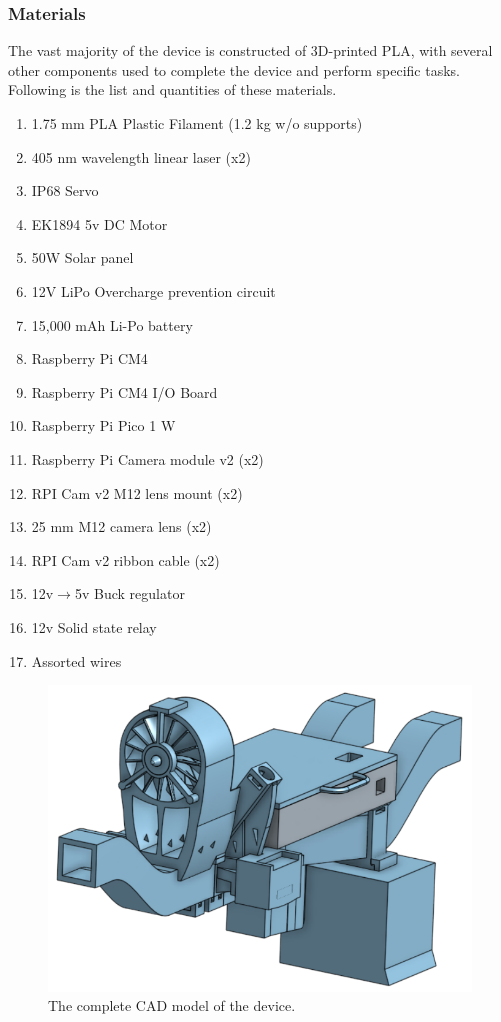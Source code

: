 \documentclass[fleqn,10pt]{SelfArx} %
\begin{document}
\begin{enumerate}
		
		
	\end{enumerate}
	\subsubsection{Materials}
	The vast majority of the device is constructed of 3D-printed PLA, with several other components used to complete the device and perform specific tasks. Following is the list and quantities of these materials.
	
	\begin{enumerate}
		
		\item 1.75 mm PLA Plastic Filament (1.2 kg w/o supports)
		\item 405 nm wavelength linear laser (x2)
		\item IP68 Servo
		\item EK1894 5v DC Motor
		\item 50W Solar panel
		\item 12V LiPo Overcharge prevention circuit
		\item 15,000 mAh Li-Po battery
		\item Raspberry Pi CM4
		\item Raspberry Pi CM4 I/O Board
		\item Raspberry Pi Pico 1 W
		\item Raspberry Pi Camera module v2 (x2)
		\item RPI Cam v2 M12 lens mount (x2)
		\item 25 mm M12 camera lens (x2)
		\item RPI Cam v2 ribbon cable (x2)
		\item 12v$\rightarrow$5v Buck regulator
		\item 12v Solid state relay
		\item Assorted wires
		
	\end{enumerate}
	
	\begin{figure}[h]
		\centering
		\includegraphics[width=1\linewidth]{Figures/CADFull}
		\caption[Complete 3D Model]{The complete CAD model of the device.}
		\label{fig:FullCAD}
	\end{figure}
\end{document}
